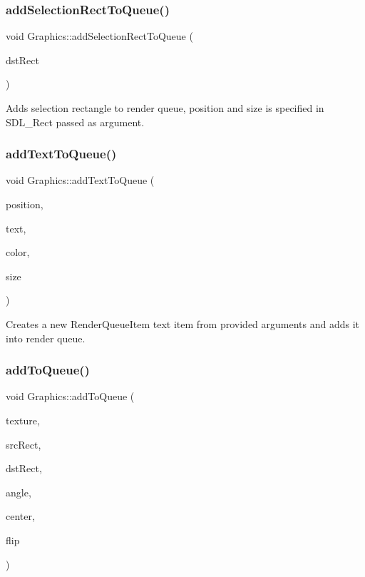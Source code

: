 \subsubsection{\texorpdfstring{add\+Selection\+Rect\+To\+Queue()}{addSelectionRectToQueue()}}
{\footnotesize\ttfamily void Graphics\+::add\+Selection\+Rect\+To\+Queue (\begin{DoxyParamCaption}\item[{const S\+D\+L\+\_\+\+Rect}]{dst\+Rect }\end{DoxyParamCaption})}

Adds selection rectangle to render queue, position and size is specified in S\+D\+L\+\_\+\+Rect passed as argument. \mbox{\label{class_graphics_aea25e7b064572a86896cc952037e2c1d}} 
\subsubsection{\texorpdfstring{add\+Text\+To\+Queue()}{addTextToQueue()}}
{\footnotesize\ttfamily void Graphics\+::add\+Text\+To\+Queue (\begin{DoxyParamCaption}\item[{const S\+D\+L\+\_\+\+Point}]{position,  }\item[{const std\+::string}]{text,  }\item[{S\+D\+L\+\_\+\+Color}]{color,  }\item[{const int}]{size }\end{DoxyParamCaption})}

Creates a new Render\+Queue\+Item text item from provided arguments and adds it into render queue. \mbox{\label{class_graphics_a18057ca5d767018b52783da0f3cd79b0}} 
\subsubsection{\texorpdfstring{add\+To\+Queue()}{addToQueue()}}
{\footnotesize\ttfamily void Graphics\+::add\+To\+Queue (\begin{DoxyParamCaption}\item[{const std\+::string}]{texture,  }\item[{const S\+D\+L\+\_\+\+Rect}]{src\+Rect,  }\item[{const S\+D\+L\+\_\+\+Rect}]{dst\+Rect,  }\item[{const double}]{angle,  }\item[{const S\+D\+L\+\_\+\+Point}]{center,  }\item[{const S\+D\+L\+\_\+\+Renderer\+Flip}]{flip }\end{DoxyParamCaption})}

